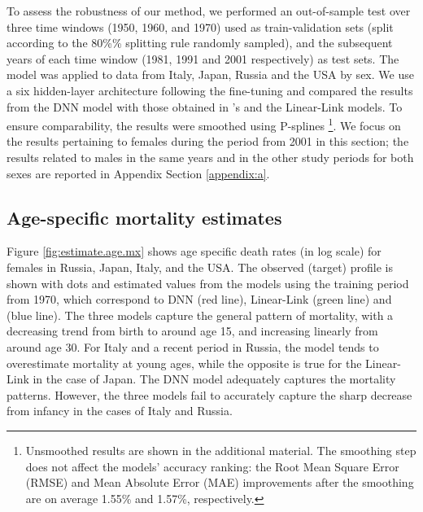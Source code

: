 \documentclass[a4,11pt]{article}
\begin{document}
To assess the robustness of our method, we performed an out-of-sample test over three time windows (1950, 1960, and 1970) used as train-validation sets (split according to the 80\%\% splitting rule randomly sampled), and the subsequent years of each time window (1981, 1991 and 2001 respectively) as test sets. The model was applied to data from Italy, Japan, Russia and the USA by sex. We use a six hidden-layer architecture following the fine-tuning and compared the results from the DNN model with those obtained in \citet{Sevcikova}'s and the Linear-Link models. To ensure comparability, the results were smoothed using P-splines \citep{HeNg}\footnote{Unsmoothed results are shown in the additional material. The smoothing step does not affect the models' accuracy ranking: the Root Mean Square Error (RMSE) and Mean Absolute Error (MAE) improvements after the smoothing are on average 1.55\% and 1.57\%, respectively.}. We focus on the results pertaining to females during the period from 2001 in this section; the results related to males in the same years and in the other study periods for both sexes are reported in Appendix Section \ref{appendix:a}. 

\subsection*{Age-specific mortality estimates}

Figure \ref{fig:estimate.age.mx} shows age specific death rates (in log scale) for females in Russia, Japan, Italy, and the USA. The observed (target) profile is shown with dots and estimated values from the models using the training period from 1970, which correspond to DNN (red line), Linear-Link (green line) and \citet{Sevcikova} (blue line). The three models capture the general pattern of mortality, with a decreasing trend from birth to around age 15, and increasing linearly from around age 30. For Italy and a recent period in Russia, the \citet{Sevcikova} model tends to overestimate mortality at young ages, while the opposite is true for the Linear-Link in the case of Japan. The DNN model adequately captures the mortality patterns. However, the three models fail to accurately capture the sharp decrease from infancy in the cases of Italy and Russia.
\end{document}
